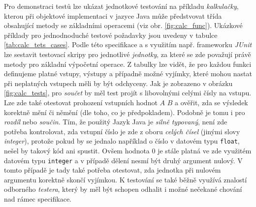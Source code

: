 \documentclass[czech, ma, kiv, he, iso690alph, pdf, viewonly]{fasthesis}
\begin{document}
    Pro demonstraci testů lze ukázat jednotkové testování na příkladu \textit{kalkulačky}, kterou při objektové implementaci v jazyce Java může předstvovat třída obsahující metody se základními operacemi (viz obr. \ref{fig:calc_func}). Ukázkové příklady pro jednodnoduché testové požadavky jsou uvedeny v tabulce \ref{tab:calc_tets_cases}. Podle této specifikace a s využitím např. frameworku \textit{JUnit} lze sestavit testovací skripy pro jednotlivé \emph{jednotky}, za které se zde považují právě metody pro základní výpočetní operace. Z tabulky lze vidět, že pro každou funkci definujeme platné vstupy, výstupy  a případně možné vyjímky, které mohou nastat při neplatných vstupech měli by být odchyceny. Jak je zobrazeno v obrázku \ref{fig:calc_tests}, pro \textit{součet} by měl test projít s libovolnými celými čísly na vstupu. Lze zde také otestovat prohození vstupních hodnot \(A\) \(B\) a ověřit, zda se výsledek korektně mění či němění (dle toho, co je předpokladem). Podobně je tomu i pro \textit{rozdíl} nebo \textit{součin}. Tím, že použitý Jazyk Java je \textit{silně typovaný}, není zde potřeba kontrolovat, zda vstupní číslo je zde z oboru \textit{celých čísel} (jinými slovy \textit{integer}), protože pokud by se jednalo například o číslo v datovém typu \verb|float|, nešel by takový kód ani spustit. Ovšem hodnota \(0\) je stále platná ve zde využitém datovém typu \verb|integer| a v případě dělení nesmí být druhý argument nulový. V tomto případě je tady také potřeba otestovat, zda jednotka při nulovém argumentu korektně skončí vyjímkou. K testování se také běžně využívá znalostí odborného \textit{testera}, který by měl být schopen odhalit i možné nečekané chování nad rámec specifikace.
\end{document}
